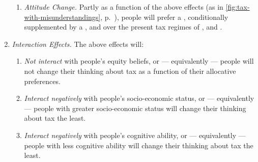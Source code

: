 \begin{enumerate}
\begin{enumerate}

					
				
				
				
			\item \label{itm:attitude-change}
				\emph{Attitude Change.}
				Partly as a function of the above effects (as in \autoref{fig:tax-with-misunderstandings}, p.~\pageref{fig:tax-with-misunderstandings}), people will prefer a , conditionally supplemented by a ,  and  over the present tax regimes of ,  and .
		\end{enumerate}
	
	\item \label{itm:interaction-effects}
		\emph{Interaction Effects.}
		The above effects will:
			\begin{enumerate}
				\item \label{itm:interact-equity}
					\emph{Not interact} with people's equity beliefs, or --- equivalently --- people will not change their thinking about tax as a function of their allocative preferences.
				\item \label{itm:interact-ses}
					\emph{Interact negatively} with people's socio-economic status, or --- equivalently --- people with greater socio-economic status will change their thinking about tax the least.
				\item \label{itm:interact-cognitive-ability}
					\emph{Interact negatively} with people's cognitive ability, or --- equivalently --- people with less cognitive ability will change their thinking about tax the least.
			\end{enumerate}
\end{enumerate}
    
